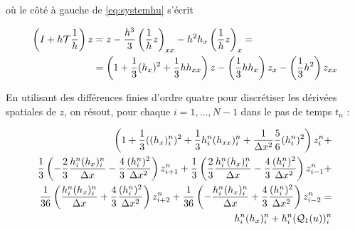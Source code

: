\noindent où le côté à gauche de \eqref{eq:systemhu} s'écrit


\begin{equation*}
\begin{aligned}
	 \left(I + h\mathcal{T}\frac{1}{h}\right)z  & =  z - \frac{h^3}{3}\left( \frac{1}{h} z\right)_{xx} - h^2h_x\left( \frac{1}{h} z\right)_x  = \\
						  &  = \left( 1 + \frac{1}{3}(h_x)^2 + \frac{1}{3}hh_{xx}\right)z - \left(\frac{1}{3}hh_x\right)z_x - \left(\frac{1}{3}h^2\right)z_{xx}
\end{aligned}
\end{equation*}

\indent En utilisant des différences finies d'ordre quatre pour discrétiser les dérivées spatiales de $z$, on résout, pour chaque $i = 1,...,N-1$ dans le pas de temps $t_n$ :

\begin{equation*}
	\begin{split}
	 \left( 1 + \frac{1}{3}((h_x)_i^n)^2 + \frac{1}{3}h_i^n (h_{xx})_i^n + \frac{1}{\Delta x^2}\frac{5}{6}(h_i^n)^2\right)z_i^n + \\
	   \frac{1}{3}\left( -\frac{2}{3}\frac{h_i^n(h_x)_i^n}{\Delta x} - \frac{4}{3}\frac{(h_i^n)^2}{\Delta x^2} \right)z_{i+1}^n +  \frac{1}{3}\left( \frac{2}{3}\frac{h_i^n(h_x)_i^n}{\Delta x} - \frac{4}{3}\frac{(h_i^n)^2}{\Delta x^2} \right)z_{i-1}^n  + \\
	   \frac{1}{36}\left( \frac{h_i^n(h_x)_i^n}{\Delta x} + \frac{4}{3}\frac{(h_i^n)^2}{\Delta x^2} \right)z_{i+2}^n + \frac{1}{36}\left( -\frac{h_i^n(h_x)_i^n}{\Delta x} + \frac{4}{3}\frac{(h_i^n)^2}{\Delta x^2} \right)z_{i-2}^n  = \\
	    h_i^n(h_x)_{i}^n  + h_i^n(\mathcal{Q}_1(u))_i^n
	\end{split}
\end{equation*}

